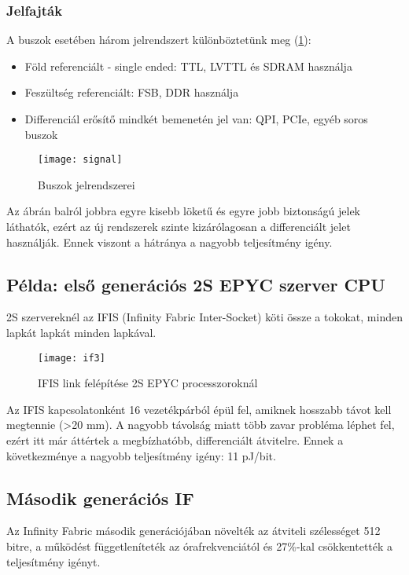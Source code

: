 \subsubsection{Jelfajták}
A buszok esetében három jelrendszert különböztetünk meg (\ref{fig:signal}):
\begin{itemize}
    \item Föld referenciált - single ended: TTL, LVTTL és SDRAM használja
    \item Feszültség referenciált: FSB, DDR használja
    \item Differenciál erősítő mindkét bemenetén jel van: QPI, PCIe, egyéb soros buszok
\end{itemize}
\begin{figure}[H]
    \texttt{[image: signal]}
    \centering
    \caption{Buszok jelrendszerei}
    \label{fig:signal}
\end{figure}
Az ábrán balról jobbra egyre kisebb löketű és egyre jobb biztonságú jelek láthatók, ezért az új rendszerek szinte kizárólagosan a differenciált jelet használják.
Ennek viszont a hátránya a nagyobb teljesítmény igény.

 \subsection{Példa: első generációs 2S EPYC szerver CPU}
 2S szervereknél az IFIS (Infinity Fabric Inter-Socket) köti össze a tokokat, minden lapkát lapkát minden lapkával.
 \begin{figure}[H]
    \texttt{[image: if3]}
    \centering
    \caption{IFIS link felépítése 2S EPYC processzoroknál}
    \label{fig:if3}
\end{figure}
Az IFIS kapcsolatonként 16 vezetékpárból épül fel, amiknek hosszabb távot kell megtennie (>20 mm).
A nagyobb távolság miatt több zavar probléma léphet fel, ezért itt már áttértek a megbízhatóbb, differenciált átvitelre.
Ennek a következménye a nagyobb teljesítmény igény: 11 pJ/bit.

\subsection{Második generációs IF}
Az Infinity Fabric második generációjában növelték az átviteli szélességet 512 bitre, a működést függetleníteték az órafrekvenciától és 27\%-kal csökkentették a teljesítmény igényt.


